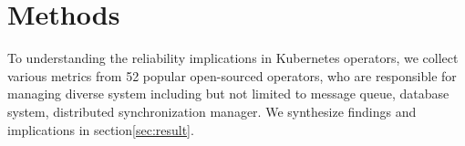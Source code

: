 \section{Methods}
To understanding the reliability implications in Kubernetes operators, we
collect various metrics from 52 popular open-sourced operators, who are
responsible for managing diverse system including but not limited to message
queue, database system, distributed synchronization manager. We synthesize
findings and implications in section\ref{sec:result}.